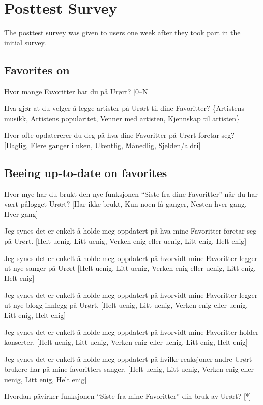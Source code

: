 \section{Posttest Survey}

The posttest survey was given to users one week after they took part in the
initial survey.

\subsection{Favorites on \urort{}}

\begin{enum}
  \item Hvor mange Favoritter har du på Urørt?
    [0--N]
  \item Hva gjør at du velger å legge artister på Urørt til dine Favoritter?
    \{Artistens musikk, Artistens popularitet, Venner med artisten,
    Kjennskap til artisten\}
  \item  Hvor ofte opdatererer du deg på hva dine Favoritter på Urørt
    foretar seg?
    [Daglig, Flere ganger i uken, Ukentlig, Månedlig, Sjelden/aldri]
\end{enum}

\subsection{Beeing up-to-date on favorites}

\begin{enum}
  \item Hvor mye har du brukt den nye funksjonen ``Siste fra dine Favoritter''
    når du har vært pålogget Urørt?
    [Har ikke brukt, Kun noen få ganger, Nesten hver gang, Hver gang]
  \item Jeg synes det er enkelt å holde meg oppdatert på
    hva mine Favoritter foretar seg på Urørt.
    [Helt uenig, Litt uenig, Verken enig eller uenig, Litt enig, Helt enig]
  \item Jeg synes det er enkelt å holde meg oppdatert på
    hvorvidt mine Favoritter legger ut nye sanger på Urørt
    [Helt uenig, Litt uenig, Verken enig eller uenig, Litt enig, Helt enig]
  \item Jeg synes det er enkelt å holde meg oppdatert på
    hvorvidt mine Favoritter legger ut nye blogg innlegg på Urørt.
    [Helt uenig, Litt uenig, Verken enig eller uenig, Litt enig, Helt enig]
  \item Jeg synes det er enkelt å holde meg oppdatert på
    hvorvidt mine Favoritter holder konserter.
    [Helt uenig, Litt uenig, Verken enig eller uenig, Litt enig, Helt enig]
  \item Jeg synes det er enkelt å holde meg oppdatert på
    hvilke reaksjoner andre Urørt brukere har på mine favoritters sanger.
    [Helt uenig, Litt uenig, Verken enig eller uenig, Litt enig, Helt enig]
  \item Hvordan påvirker funksjonen ``Siste fra mine Favoritter'' din bruk av
    Urørt? [*]
\end{enum}


